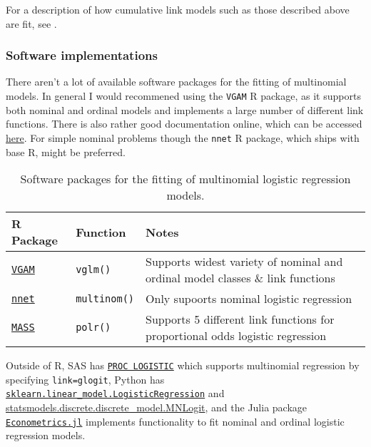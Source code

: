 \documentclass{report}
\begin{document}
For a description of how cumulative link models such as those described above are fit, see \cite[Chapter~6.2.4]{agresti_foundations_2015}. 

\subsubsection{Software implementations}

There aren't a lot of available software packages for the fitting of multinomial models. In general I would recommened using the \texttt{VGAM} R package, as it supports both nominal and ordinal models and implements a large number of different link functions. There is also rather good documentation online, which can be accessed \href{https://www.stat.auckland.ac.nz/~yee/VGAM/}{here}. For simple nominal problems though the \texttt{nnet} R package, which ships with base R, might be preferred. 

\begin{table}[h!]
\centering
\begin{tabular}{||l l l||} 
  \hline
  \textbf{R Package} & \textbf{Function} & \textbf{Notes} \\ [0.5ex]
  \hline\hline
  \href{https://cran.r-project.org/web/packages/VGAM/index.html}{\texttt{VGAM}} & \texttt{vglm()} & Supports widest variety of nominal and ordinal model classes \& link functions \\
  \hline
  \href{https://cran.r-project.org/web/packages/nnet/index.html}{\texttt{nnet}} & \texttt{multinom()} & Only supoorts nominal logistic regression \\
  \hline 
  \href{https://cran.r-project.org/web/packages/MASS/index.html}{\texttt{MASS}} & \texttt{polr()} & Supports 5 different link functions for proportional odds logistic regression \\
  \hline 
\end{tabular}
\caption{Software packages for the fitting of multinomial logistic regression models.}
\label{table:multinomial-software}
\end{table}

Outside of R, SAS has \href{https://support.sas.com/documentation/cdl/en/statug/63347/HTML/default/viewer.htm#statug_logistic_sect004.htm}{\texttt{PROC LOGISTIC}} which supports multinomial regression by specifying \texttt{link=glogit}, Python has \href{https://scikit-learn.org/stable/modules/generated/sklearn.linear_model.LogisticRegression.html}{\texttt{sklearn.linear\_model.LogisticRegression}} and \href{https://www.statsmodels.org/stable/generated/statsmodels.discrete.discrete_model.MNLogit.html}{statsmodels.discrete.discrete\_model.MNLogit}, and the Julia package \href{https://juliahub.com/ui/Packages/General/Econometrics}{\texttt{Econometrics.jl}} implements functionality to fit nominal and ordinal logistic regression models. 
\end{document}
